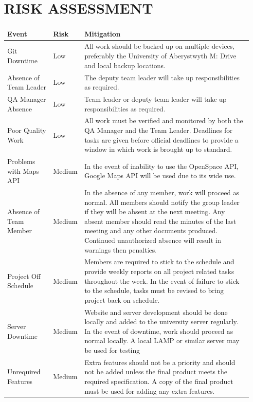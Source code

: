 \documentclass[12pt]{article}
\begin{document}
{\section{RISK ASSESSMENT}
\begin{longtable}{|p{2.5cm}|p{1.5cm}|p{10cm}|}
\hline
	Event & Risk & Mitigation\\
\hline
	Git Downtime & Low & All work should be backed up on multiple devices, preferably the University of Aberystwyth M: Drive and local backup locations.\\
\hline
	Absence of Team Leader & Low & The deputy team leader will take up responsibilities as required.\\
\hline
	QA Manager Absence & Low & Team leader or deputy team leader will take up responsibilities as required. \\
\hline 
	Poor Quality Work & Low & All work must be verified and monitored by both the QA Manager and the Team Leader. Deadlines for tasks are given before official deadlines to provide a window in which work is brought up to standard. \\ 
\hline
	Problems with Maps API & Medium & In the event of inability to use the OpenSpace API, Google Maps API will be used due to its wide use. \\ 
\hline 
	Absence of Team Member & Medium & 
In the absence of any member, work will proceed as normal. All members should notify the group leader if they will be absent at the next meeting. Any absent member should read the minutes of the last meeting and any other documents produced. Continued unauthorized absence will result in warnings then penalties.\\
\hline 
	Project Off Schedule & Medium & Members are required to stick to the schedule and provide weekly reports on all project related tasks throughout the week. In the event of failure to stick to the schedule, tasks must be revised to bring project back on schedule.\\
\hline 
	Server Downtime & Medium & Website and server development should be done locally and added to the university server regularly. In the event of downtime, work should proceed as normal locally. A local LAMP or similar server may be used for testing \\
\hline 
	Unrequired Features & Medium & Extra features should not be a priority and should not be added unless the final product meets the required specification. A copy of the final product must be used for adding any extra features. \\

\end{longtable}}
\end{document}
